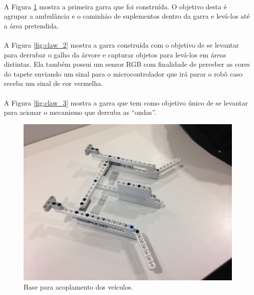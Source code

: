 \documentclass{article}
\begin{document}
	\paragraph{}
		A Figura \ref{fig:claw_1} mostra a primeira garra que foi construída. O objetivo desta 
		é agrupar a ambulância e o caminhão de suplementos dentro da garra e 
		levá-los até a área pretendida.
	\paragraph{}
		A Figura \ref{fig:claw_2} mostra a garra construída com o objetivo de se levantar para 
		derrubar o galho da árvore e capturar objetos para levá-los em áreas 
		distintas. Ela também possui um sensor RGB com finalidade de perceber as 
		cores do tapete enviando um sinal para o microcontrolador que irá parar 
		o robô caso receba um sinal de cor vermelha.
	\paragraph{}
		A Figura \ref{fig:claw_3} mostra a garra que tem como objetivo único de se levantar 
		para acionar o mecanismo que derruba as “ondas”.

	\begin{figure}[h!]
		\includegraphics[width=\linewidth]{../Images/claw_1.JPG}
		\caption{Base para acoplamento dos veículos.}
		\label{fig:claw_1}
	\end{figure}
\end{document}
